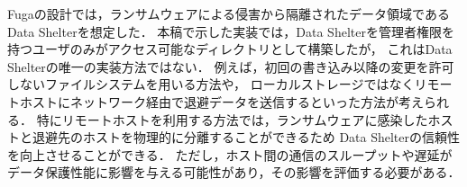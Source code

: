Fugaの設計では，ランサムウェアによる侵害から隔離されたデータ領域であるData Shelterを想定した．
本稿で示した実装では，Data Shelterを管理者権限を持つユーザのみがアクセス可能なディレクトリとして構築したが，
これはData Shelterの唯一の実装方法ではない．
例えば，初回の書き込み以降の変更を許可しないファイルシステムを用いる方法や，
ローカルストレージではなくリモートホストにネットワーク経由で退避データを送信するといった方法が考えられる．
特にリモートホストを利用する方法では，ランサムウェアに感染したホストと退避先のホストを物理的に分離することができるため
Data Shelterの信頼性を向上させることができる．
ただし，ホスト間の通信のスループットや遅延がデータ保護性能に影響を与える可能性があり，その影響を評価する必要がある．

